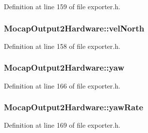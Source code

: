 Definition at line 159 of file exporter.\-h.

\hypertarget{group___mo_cap_plugin_gadfa715081f6bc74af7efc32c39d720f2}{
\subsubsection[{vel\-North}]{ Mocap\-Output2\-Hardware\-::vel\-North}}\label{group___mo_cap_plugin_gadfa715081f6bc74af7efc32c39d720f2}


Definition at line 158 of file exporter.\-h.

\hypertarget{group___mo_cap_plugin_ga423b4c125aa4c8caf1001d16de1dd3f9}{
\subsubsection[{yaw}]{ Mocap\-Output2\-Hardware\-::yaw}}\label{group___mo_cap_plugin_ga423b4c125aa4c8caf1001d16de1dd3f9}


Definition at line 166 of file exporter.\-h.

\hypertarget{group___mo_cap_plugin_gaddfb563223971f02a45ebd14034b2a06}{
\subsubsection[{yaw\-Rate}]{ Mocap\-Output2\-Hardware\-::yaw\-Rate}}\label{group___mo_cap_plugin_gaddfb563223971f02a45ebd14034b2a06}


Definition at line 169 of file exporter.\-h.




